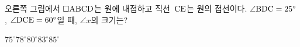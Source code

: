 \noindent\begin{minipage}[t]{0.58\linewidth}\vspace{0pt}\raggedright 오른쪽 그림에서 $\square\mathrm{ABCD}$는 원에 내접하고 직선~$\mathrm{CE}$는 원의 접선이다. $\angle\mathrm{BDC}=25^\circ$, $\angle\mathrm{DCE}=60^\circ$일 때, $\angle x$의 크기는?\end{minipage}\hfill\begin{minipage}[t]{0.4\linewidth}\vspace{0pt}\centering \resizebox{\ifdim\width>\linewidth\linewidth\else\width\fi}{!}{}\end{minipage}\par
\begin{choicesii}{$75^\circ$}{$78^\circ$}{$80^\circ$}{$83^\circ$}{$85^\circ$}\end{choicesii}
